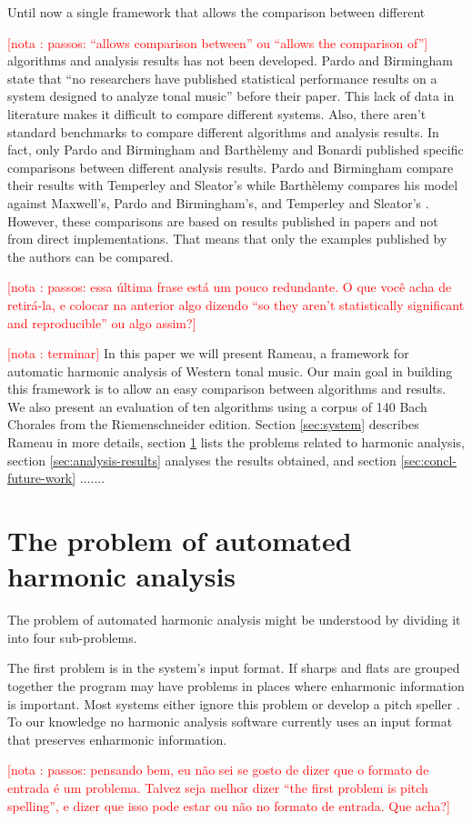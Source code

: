 \documentclass{article}
\newcounter{notacounter}
\newcommand{\nota}[1]{
  \addtocounter{notacounter}{1}
  \textcolor{red}{[nota \arabic{notacounter}: #1]}
}
\begin{document}
Until now a single framework that allows the comparison between
different \nota{passos: ``allows comparison between'' ou ``allows the
  comparison of''} algorithms and analysis results has not been
developed.  Pardo and Birmingham state that ``no researchers have
published statistical performance results on a system designed to
analyze tonal music'' \cite{pardo02:algorithms} before their
paper. This lack of data in literature makes it difficult to compare
different systems.  Also, there aren't standard benchmarks to compare
different algorithms and analysis results. In fact, only Pardo and
Birmingham \cite{pardo00:automated} and Barthèlemy and Bonardi
\cite{barthelemy01:figured} published specific comparisons between
different analysis results. Pardo and Birmingham compare their results
with Temperley and Sleator's \cite{temperley99:modeling} while
Barthèlemy compares his model against Maxwell's, Pardo and
Birmingham's, and Temperley and Sleator's
\cite{maxwell92:expert,temperley96:algorithm,pardo99:automated}.
However, these comparisons are based on results published in papers
and not from direct implementations. That means that only the examples
published by the authors can be compared. \nota{passos: essa última
  frase está um pouco redundante. O que você acha de retirá-la, e
  colocar na anterior algo dizendo ``so they aren't statistically
  significant and reproducible'' ou algo assim?}

\nota{terminar} In this paper we will present Rameau, a framework for
automatic harmonic analysis of Western tonal music. Our main goal in
building this framework is to allow an easy comparison between
algorithms and results. We also present an evaluation of ten
algorithms using a corpus of 140 Bach Chorales from the
Riemenschneider edition. Section \ref{sec:system} describes Rameau in
more details, section \ref{sec:problem} lists the problems related to
harmonic analysis, section \ref{sec:analysis-results} analyses the
results obtained, and section \ref{sec:concl-future-work} .......

\section{The problem of automated harmonic analysis}
\label{sec:problem}

The problem of automated harmonic analysis might be understood by
dividing it into four sub-problems. 

The first problem is in the system's input format. If sharps and flats
are grouped together the program may have problems in places where
enharmonic information is important. Most systems either ignore this
problem or develop a pitch speller \cite{temperley99:modeling}. To our
knowledge no harmonic analysis software currently uses an input format
that preserves enharmonic information. \nota{ passos: pensando bem, eu
  não sei se gosto de dizer que o formato de entrada é um
  problema. Talvez seja melhor dizer ``the first problem is pitch
  spelling'', e dizer que isso pode estar ou não no formato de
  entrada. Que acha?}
\end{document}
